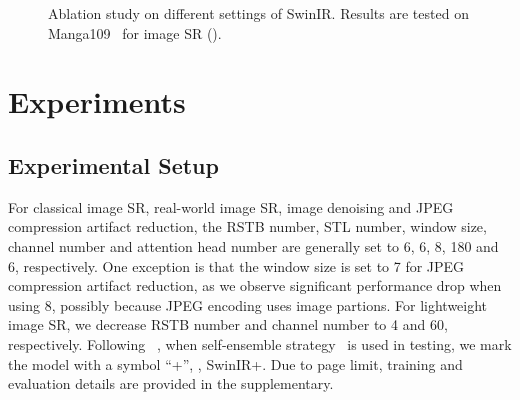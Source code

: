 \documentclass[10pt,twocolumn,letterpaper]{article}
\newlength \g
\begin{document}
\subfigcapskip=-0.2cm
\begin{figure*}[!t]
\captionsetup{font=small}
\begin{center}
\hspace{0.05\textwidth}\vspace{-0.1cm}
 \hspace{0.05\textwidth}\vspace{-0.1cm}
 \vspace{-0.1cm}
\hspace{0.05\textwidth}
 \hspace{0.05\textwidth}
\end{center}\vspace{-0.7cm}
\caption{Ablation study on different settings of SwinIR. Results are tested on Manga109~\cite{Manga109} for image SR ().}
\vspace{-0.3cm}
\label{fig:ablation}
\end{figure*}
\subfigcapskip=0.1cm




\section{Experiments}
\subsection{Experimental Setup}
For classical image SR, real-world image SR, image denoising and JPEG compression artifact reduction, the RSTB number, STL number, window size, channel number and attention head number are generally set to 6, 6, 8, 180 and 6, respectively. One exception is that the window size is set to 7 for JPEG compression artifact reduction, as we observe significant performance drop when using 8, possibly because JPEG encoding uses  image partions. For lightweight image SR, we decrease RSTB number and channel number to 4 and 60, respectively. Following ~\cite{zhang2018rcan, niu2020HAN}, when self-ensemble strategy~\cite{lim2017edsr} is used in testing, we mark the model with a symbol ``+'', \eg, SwinIR+.  Due to page limit, training and evaluation details are provided in the supplementary.
\end{document}
